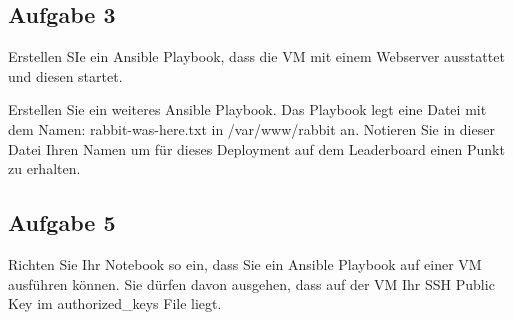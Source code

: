 \documentclass{article}
\begin{document}
    \subsection{Aufgabe 3}
    Erstellen SIe ein Ansible Playbook, dass die VM mit einem Webserver ausstattet und diesen startet.

    Erstellen Sie ein weiteres Ansible Playbook. Das Playbook legt eine Datei mit dem Namen: rabbit-was-here.txt in /var/www/rabbit an.
    Notieren Sie in dieser Datei Ihren Namen um für dieses Deployment auf dem Leaderboard einen Punkt zu erhalten.
    
    \subsection{Aufgabe 5}
    Richten Sie Ihr Notebook so ein, dass Sie ein Ansible Playbook auf einer VM ausführen können.
    Sie dürfen davon ausgehen, dass auf der VM Ihr SSH Public Key im authorized_keys File liegt.
\end{document}
